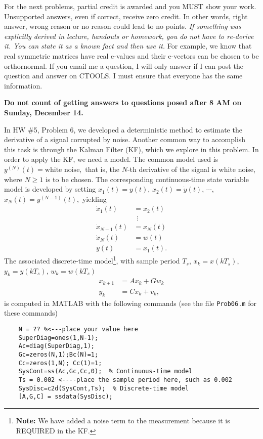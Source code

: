 \documentclass[letterpaper]{article}
\begin{document}
\vspace*{1in}

{\Large  For the next problems, partial credit is awarded and you MUST show your work. Unsupported answers, even if correct, receive zero credit. In other words, right answer, wrong
reason or no reason could lead to no points.   \emph{If something was explicitly derived in lecture, handouts or homework, you do not have to re-derive it. You can state it as a known fact and then use it.} For example, we know that real symmetric matrices have real e-values and their e-vectors can be chosen to be orthornormal. If you email me a question, I will only answer if I can post the question and answer on CTOOLS. I must ensure that everyone has the same information. }

\vspace*{4cm} \textbf{ \LARGE Do not count of getting answers to questions posed after 8 AM on Sunday, December 14.}


\newpage

  In HW \#5, Problem 6, we developed a deterministic method to estimate the derivative of a signal corrupted by noise. Another common way to accomplish this task is through the Kalman Filter (KF), which we explore in this problem. In order to apply the KF, we need a model. The common model used is $y^{(N)}(t) = \text{white noise},$ that is, the $N$-th derivative of the signal is white noise, where $N\ge 1$ is to be chosen. The corresponding continuous-time state variable model is developed by setting $x_1(t) = y(t)$, $x_2(t) = \dot{y}(t)$, $\cdots$, $x_N(t) = y^{(N-1)}(t),$ yielding
\begin{align*}
\dot{x}_1(t) &= x_2(t) \\
& \ ~ \vdots \\
\dot{x}_{N-1} (t)& = x_N(t) \\
\dot{x}_{N} (t)& = w(t)\\
y(t) & =x_1(t).
\end{align*}
The  associated discrete-time model\footnote{ \textbf{Note:} We have added a noise term to the measurement because it is REQUIRED in the KF.}, with sample period $T_s$, $x_k = x(k T_s)$, $y_k = y(k T_s)$, $w_k = w(k T_s)$
\begin{align*}
x_{k+1} &=  A x_{k} + G w_{k} \\
y_k & =C x_k +  v_k,
\end{align*}
 is computed in MATLAB with the following commands (see the file \texttt{Prob06.m} for these commands)
 \begin{verbatim}
    N = ?? %<---place your value here
    SuperDiag=ones(1,N-1);
    Ac=diag(SuperDiag,1);
    Gc=zeros(N,1);Bc(N)=1;
    Cc=zeros(1,N); Cc(1)=1;
    SysCont=ss(Ac,Gc,Cc,0);  % Continuous-time model
    Ts = 0.002 <----place the sample period here, such as 0.002
    SysDisc=c2d(SysCont,Ts);  % Discrete-time model
    [A,G,C] = ssdata(SysDisc);
 \end{verbatim}
\end{document}
